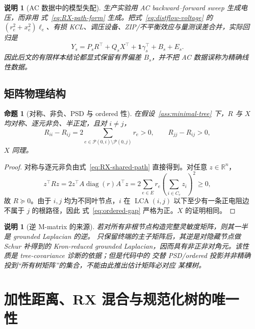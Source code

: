 \documentclass[UTF8,11pt]{ctexart}
\newtheorem{proposition}[definition]{命题}
\newtheorem{remark}[definition]{说明}
\newcommand{\R}{\mathbb R}
\newcommand{\pathset}{\mathcal P}
\newcommand{\diag}{\operatorname{diag}}
\newcommand{\lca}{\operatorname{LCA}}
\begin{document}
\begin{remark}[AC 数据中的模型失配]
生产实验用 AC backward--forward sweep 生成电压，而非用
式~\eqref{eq:RX-path-form} 生成。把式~\eqref{eq:distflow-voltage} 的
$(r_e^2+x_e^2)\ell_e$、有损 KCL、调压设备、ZIP/不平衡效应与量测误差合并，实际回归是
\begin{equation}
 Y_s=P_sR^\top+Q_sX^\top+\bm1\gamma_s^\top+B_s+E_s.
 \label{eq:statistical-model}
\end{equation}
因此后文的有限样本结论都显式保留有界偏差 $B_s$，并不把 AC 数据误称为精确线性数据。
\end{remark}

\subsection{矩阵物理结构}

\begin{proposition}[对称、非负、PSD 与 ordered 性]
\label{prop:matrix-structure}
在假设~\ref{ass:minimal-tree} 下，$R$ 与 $X$ 均对称、逐元非负、半正定，且对
$i\neq j$，
\begin{equation}
 R_{ii}-R_{ij}
 =2\sum_{e\in\pathset(0,i)\setminus\pathset(0,j)}r_e>0,
 \qquad
 R_{jj}-R_{ij}>0,
 \label{eq:ordered-gap}
\end{equation}
$X$ 同理。
\end{proposition}

\begin{proof}
对称与逐元非负由式~\eqref{eq:RX-shared-path} 直接得到。对任意 $z\in\R^n$，
\begin{equation*}
 z^\top Rz
 =2z^\top A\diag(r)A^\top z
 =2\sum_{e\in E}r_e\left(\sum_{i\in C_e}z_i\right)^2\ge0,
\end{equation*}
故 $R\succeq0$。由于 $i,j$ 均为不同叶节点，$i$ 在
$\lca(i,j)$ 以下至少有一条正电阻边不属于 $j$ 的根路径，因此
式~\eqref{eq:ordered-gap} 严格为正。$X$ 的证明相同。
\end{proof}

\begin{remark}[逆 M-matrix 的来源]
若对所有非根节点构造完整灵敏度矩阵，则其一半是 grounded Laplacian 的逆。
只保留终端的主子矩阵后，其逆是对隐藏节点做 Schur 补得到的 Kron-reduced grounded
Laplacian，因而具有非正非对角元。该性质是 tree-covariance 诊断的依据；但是代码中的
交替 PSD/ordered 投影并非精确投到“所有树矩阵”的集合，不能由此推出估计矩阵必对应
某棵树。
\end{remark}

\section{加性距离、RX 混合与规范化树的唯一性}
\end{document}
